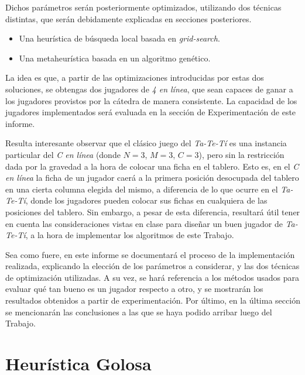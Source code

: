 \documentclass[12pt,a4paper]{article}
\begin{document}
Dichos parámetros serán posteriormente optimizados, utilizando dos técnicas distintas, que serán debidamente explicadas en secciones posteriores.
\begin{itemize}
    \item Una heurística de búsqueda local basada en \textit{grid-search}.
    \item Una metaheurística basada en un algoritmo genético.
\end{itemize}

La idea es que, a partir de las optimizaciones introducidas por estas dos soluciones, se obtengas dos jugadores de \textit{4 en línea}, que sean capaces de ganar a los jugadores provistos por la cátedra de manera consistente. La capacidad de los jugadores implementados será evaluada en la sección de Experimentación de este informe.

Resulta interesante observar que el clásico juego del \textit{Ta-Te-Tí} es una instancia particular del \textit{C en línea} (donde $N = 3$, $M = 3$, $C = 3$), pero sin la restricción dada por la gravedad a la hora de colocar una ficha en el tablero. Esto es, en el \textit{C en línea} la ficha de un jugador caerá a la primera posición desocupada del tablero en una cierta columna elegida del mismo, a diferencia de lo que ocurre en el \textit{Ta-Te-Tí}, donde los jugadores pueden colocar sus fichas en cualquiera de las posiciones del tablero. Sin embargo, a pesar de esta diferencia, resultará útil tener en cuenta las consideraciones vistas en clase para diseñar un buen jugador de \textit{Ta-Te-Tí}, a la hora de implementar los algoritmos de este Trabajo.

Sea como fuere, en este informe se documentará el proceso de la implementación realizada, explicando la elección de los parámetros a considerar, y las dos técnicas de optimización utilizadas. A su vez, se hará referencia a los métodos usados para evaluar qué tan bueno es un jugador respecto a otro, y se mostrarán los resultados obtenidos a partir de experimentación. Por último, en la última sección se mencionarán las conclusiones a las que se haya podido arribar luego del Trabajo.

\newpage




\section{Heurística Golosa}
\end{document}
